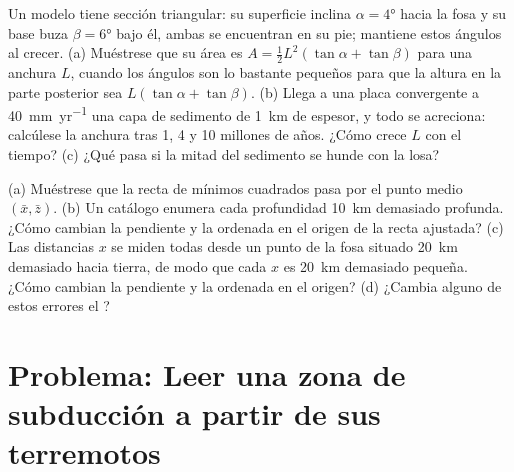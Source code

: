 \begin{exercise}[$\star\star\star$]\label{exo:b1:active-margins:11}
Un  modelo tiene sección triangular: su superficie inclina $\alpha = \ang{4}$ hacia la fosa y su base buza $\beta = \ang{6}$ bajo él, ambas
se encuentran en su pie; mantiene estos ángulos al crecer. (a) Muéstrese que su área es $A = \frac12 L^2(\tan\alpha + \tan\beta)$ para una anchura $L$, cuando los
ángulos son lo bastante pequeños para que la altura en la parte posterior sea $L(\tan\alpha + \tan\beta)$. (b) Llega a una placa convergente a \qty{40}{mm.yr^{-1}} una
capa de sedimento de \qty{1}{km} de espesor, y todo se acreciona: calcúlese la anchura tras 1, 4 y 10 millones de años. ¿Cómo crece $L$ con el tiempo? (c) ¿Qué pasa si
la mitad del sedimento se hunde con la losa?
\end{exercise}

\begin{exercise}[$\star\star\star$]\label{exo:b1:active-margins:12}
(a) Muéstrese que la recta de mínimos cuadrados pasa por el punto medio $(\bar x, \bar z)$. (b) Un catálogo enumera cada profundidad \qty{10}{km} demasiado profunda.
¿Cómo cambian la pendiente y la ordenada en el origen de la recta ajustada? (c) Las distancias $x$ se miden todas desde un punto de la fosa situado \qty{20}{km} demasiado
hacia tierra, de modo que cada $x$ es \qty{20}{km} demasiado pequeña. ¿Cómo cambian la pendiente y la ordenada en el origen? (d) ¿Cambia alguno de estos errores el ?
\end{exercise}

\section{Problema: Leer una zona de subducción a partir de sus terremotos}

